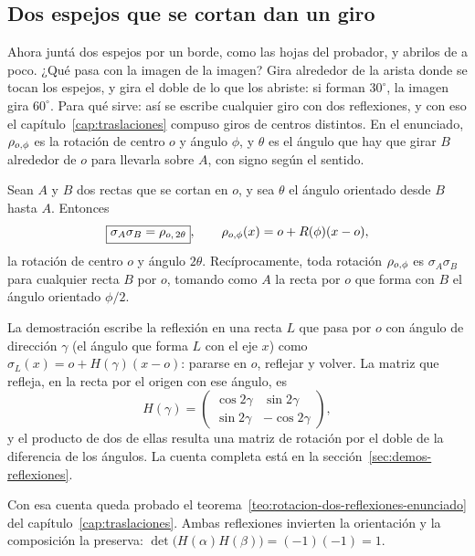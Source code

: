 \subsection{Dos espejos que se cortan dan un giro}\label{sec:espejos-secantes}

Ahora juntá dos espejos por un borde, como las hojas del probador, y abrilos de a poco. ¿Qué
pasa con la imagen de la imagen? Gira alrededor de la arista donde se tocan los espejos, y gira
el doble de lo que los abriste: si forman \(30^\circ\), la imagen gira \(60^\circ\). Para qué
sirve: así se escribe cualquier giro con dos reflexiones, y con eso el
capítulo~\ref{cap:traslaciones} compuso giros de centros distintos. En el enunciado,
\(\rho_{o,\phi}\) es la rotación de centro \(o\) y ángulo \(\phi\), y \(\theta\) es el ángulo que
hay que girar \(B\) alrededor de \(o\) para llevarla sobre \(A\), con signo según el sentido.

\begin{teorema}\label{teo:rotacion-dos-reflexiones}
Sean \(A\) y \(B\) dos rectas que se cortan en \(o\), y sea \(\theta\) el ángulo orientado
desde \(B\) hasta \(A\). Entonces
\[
  \boxed{\sigma_{A}\sigma_{B}=\rho_{o,\,2\theta}},
  \qquad \rho_{o,\phi}(x)=o+R(\phi)(x-o),
\]
la rotación de centro \(o\) y ángulo \(2\theta\). Recíprocamente, toda rotación
\(\rho_{o,\phi}\) es \(\sigma_{A}\sigma_{B}\) para cualquier recta \(B\) por \(o\), tomando como
\(A\) la recta por \(o\) que forma con \(B\) el ángulo orientado \(\phi/2\).
\end{teorema}

La demostración escribe la reflexión en una recta \(L\) que pasa por \(o\) con ángulo de
dirección \(\gamma\) (el ángulo que forma \(L\) con el eje \(x\)) como
\(\sigma_{L}(x)=o+H(\gamma)(x-o)\): pararse en \(o\), reflejar y volver. La matriz que refleja, en
la recta por el origen con ese ángulo, es
\[
  H(\gamma)=
  \begin{pmatrix}
    \cos 2\gamma & \sin 2\gamma\\
    \sin 2\gamma &-\cos 2\gamma
  \end{pmatrix},
\]
y el producto de dos de ellas resulta una matriz de rotación por el doble de la diferencia de
los ángulos. La cuenta completa está en la sección~\ref{sec:demos-reflexiones}.

Con esa cuenta queda probado el teorema~\ref{teo:rotacion-dos-reflexiones-enunciado} del
capítulo~\ref{cap:traslaciones}. Ambas reflexiones invierten la orientación y la composición la
preserva:
\(\det\bigl(H(\alpha)H(\beta)\bigr)=(-1)(-1)=1\).

